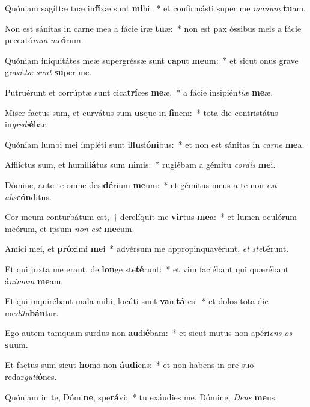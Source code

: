 \item Quóniam sagíttæ tuæ in\textbf{fí}xæ sunt \textbf{mi}hi:~* et confirmásti super me \textit{ma}\textit{num} \textbf{tu}am.
\item Non est sánitas in carne mea a fácie \textbf{i}ræ \textbf{tu}æ:~* non est pax óssibus meis a fácie peccató\textit{rum} \textit{me}\textbf{ó}rum.
\item Quóniam iniquitátes meæ supergréssæ sunt \textbf{ca}put \textbf{me}um:~* et sicut onus grave gravá\textit{tæ} \textit{sunt} \textbf{su}per me.
\item Putruérunt et corrúptæ sunt cica\textbf{trí}ces \textbf{me}æ,~* a fácie insipién\textit{ti}\textit{æ} \textbf{me}æ.
\item Miser factus sum, et curvátus sum \textbf{us}que in \textbf{fi}nem:~* tota die contristátus in\textit{gre}\textit{di}\textbf{é}bar.
\item Quóniam lumbi mei impléti sunt il\textbf{lu}si\textbf{ó}\textbf{ni}bus:~* et non est sánitas in \textit{car}\textit{ne} \textbf{me}a.
\item Afflíctus sum, et humili\textbf{á}tus sum \textbf{ni}mis:~* rugiébam a gémitu \textit{cor}\textit{dis} \textbf{me}i.
\item Dómine, ante te omne desi\textbf{dé}rium \textbf{me}um:~* et gémitus meus a te non \textit{est} \textit{abs}\textbf{cón}ditus.
\item Cor meum conturbátum est,~† derelíquit me \textbf{vir}tus \textbf{me}a:~* et lumen oculórum meórum, et ipsum \textit{non} \textit{est} \textbf{me}cum.
\item Amíci mei, et \textbf{pró}ximi \textbf{me}i~* advérsum me appropinquavérunt, \textit{et} \textit{ste}\textbf{té}runt.
\item Et qui juxta me erant, de \textbf{lon}ge ste\textbf{té}runt:~* et vim faciébant qui quærébant á\textit{ni}\textit{mam} \textbf{me}am.
\item Et qui inquirébant mala mihi, locúti sunt \textbf{va}ni\textbf{tá}tes:~* et dolos tota die me\textit{di}\textit{ta}\textbf{bán}tur.
\item Ego autem tamquam surdus non \textbf{au}di\textbf{é}bam:~* et sicut mutus non apéri\textit{ens} \textit{os} \textbf{su}um.
\item Et factus sum sicut \textbf{ho}mo non \textbf{áu}\textbf{di}ens:~* et non habens in ore suo redar\textit{gu}\textit{ti}\textbf{ó}nes.
\item Quóniam in te, Dómi\textbf{ne}, spe\textbf{rá}vi:~* tu exáudies me, Dómine, \textit{De}\textit{us} \textbf{me}us.
